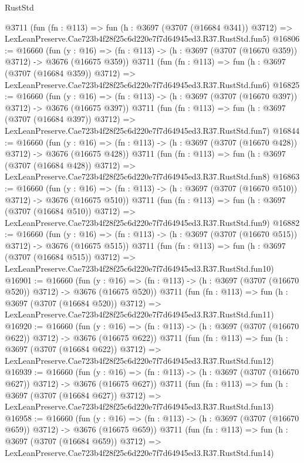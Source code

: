 \begin{lexlean}{RustStd}
\begin{coremodule}
    @3711
    (fun (fn : @113) =>
    fun (h : @3697 (@3707 (@16684 @341)) @3712) =>
    LexLeanPreserve.Cae723b4f28f25c6d220e7f7d64945ed3.R37.RustStd.fun5)
@16806 := @16660
    (fun (y : @16) => (fn : @113) -> (h : @3697 (@3707 (@16670 @359)) @3712) -> @3676 (@16675 @359))
    @3711
    (fun (fn : @113) =>
    fun (h : @3697 (@3707 (@16684 @359)) @3712) =>
    LexLeanPreserve.Cae723b4f28f25c6d220e7f7d64945ed3.R37.RustStd.fun6)
@16825 := @16660
    (fun (y : @16) => (fn : @113) -> (h : @3697 (@3707 (@16670 @397)) @3712) -> @3676 (@16675 @397))
    @3711
    (fun (fn : @113) =>
    fun (h : @3697 (@3707 (@16684 @397)) @3712) =>
    LexLeanPreserve.Cae723b4f28f25c6d220e7f7d64945ed3.R37.RustStd.fun7)
@16844 := @16660
    (fun (y : @16) => (fn : @113) -> (h : @3697 (@3707 (@16670 @428)) @3712) -> @3676 (@16675 @428))
    @3711
    (fun (fn : @113) =>
    fun (h : @3697 (@3707 (@16684 @428)) @3712) =>
    LexLeanPreserve.Cae723b4f28f25c6d220e7f7d64945ed3.R37.RustStd.fun8)
@16863 := @16660
    (fun (y : @16) => (fn : @113) -> (h : @3697 (@3707 (@16670 @510)) @3712) -> @3676 (@16675 @510))
    @3711
    (fun (fn : @113) =>
    fun (h : @3697 (@3707 (@16684 @510)) @3712) =>
    LexLeanPreserve.Cae723b4f28f25c6d220e7f7d64945ed3.R37.RustStd.fun9)
@16882 := @16660
    (fun (y : @16) => (fn : @113) -> (h : @3697 (@3707 (@16670 @515)) @3712) -> @3676 (@16675 @515))
    @3711
    (fun (fn : @113) =>
    fun (h : @3697 (@3707 (@16684 @515)) @3712) =>
    LexLeanPreserve.Cae723b4f28f25c6d220e7f7d64945ed3.R37.RustStd.fun10)
@16901 := @16660
    (fun (y : @16) => (fn : @113) -> (h : @3697 (@3707 (@16670 @520)) @3712) -> @3676 (@16675 @520))
    @3711
    (fun (fn : @113) =>
    fun (h : @3697 (@3707 (@16684 @520)) @3712) =>
    LexLeanPreserve.Cae723b4f28f25c6d220e7f7d64945ed3.R37.RustStd.fun11)
@16920 := @16660
    (fun (y : @16) => (fn : @113) -> (h : @3697 (@3707 (@16670 @622)) @3712) -> @3676 (@16675 @622))
    @3711
    (fun (fn : @113) =>
    fun (h : @3697 (@3707 (@16684 @622)) @3712) =>
    LexLeanPreserve.Cae723b4f28f25c6d220e7f7d64945ed3.R37.RustStd.fun12)
@16939 := @16660
    (fun (y : @16) => (fn : @113) -> (h : @3697 (@3707 (@16670 @627)) @3712) -> @3676 (@16675 @627))
    @3711
    (fun (fn : @113) =>
    fun (h : @3697 (@3707 (@16684 @627)) @3712) =>
    LexLeanPreserve.Cae723b4f28f25c6d220e7f7d64945ed3.R37.RustStd.fun13)
@16958 := @16660
    (fun (y : @16) => (fn : @113) -> (h : @3697 (@3707 (@16670 @659)) @3712) -> @3676 (@16675 @659))
    @3711
    (fun (fn : @113) =>
    fun (h : @3697 (@3707 (@16684 @659)) @3712) =>
    LexLeanPreserve.Cae723b4f28f25c6d220e7f7d64945ed3.R37.RustStd.fun14)

\end{coremodule}
\end{lexlean}
